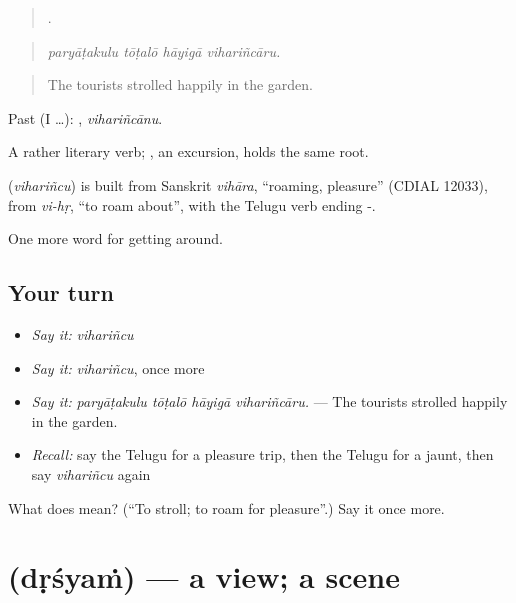 \begin{quote}
   .
\end{quote}

\begin{quote}
\emph{paryāṭakulu tōṭalō hāyigā vihariñcāru.}
\end{quote}

\begin{quote}
The tourists strolled happily in the garden.
\end{quote}

Past (I …): , \emph{vihariñcānu}.

A rather literary verb; , an excursion, holds the same root.

\begin{cousinweb}
\textbf{} (\emph{vihariñcu}) is built from Sanskrit \emph{vihāra}, \textquotedblleft{}roaming, pleasure\textquotedblright{} (CDIAL 12033), from \emph{vi-hṛ}, \textquotedblleft{}to roam about\textquotedblright{}, with the Telugu verb ending -.
\end{cousinweb}

\begin{grammarlens}[title={What you've built}]
One more word for getting around.
\end{grammarlens}

\subsection*{Your turn}
\begin{itemize}
\raggedright
  \item \emph{Say it:} \emph{vihariñcu}
  \item \emph{Say it:} \emph{vihariñcu}, once more
  \item \emph{Say it:} \emph{paryāṭakulu tōṭalō hāyigā vihariñcāru.} — The tourists strolled happily in the garden.
  \item \emph{Recall:} say the Telugu for a pleasure trip, then the Telugu for a jaunt, then say \emph{vihariñcu} again
\end{itemize}

\begin{tcolorbox}[breakable,colback=teal!4,colframe=teal!35!black,title={Before you move on}]
What does  mean? (\textquotedblleft{}To stroll; to roam for pleasure\textquotedblright{}.) Say it once more.
\end{tcolorbox}
\section[\texorpdfstring{\te{దృశ్యం} (dṛśyaṁ)}{దృశ్యం (dṛśyaṁ)}]{ (dṛśyaṁ) — a view; a scene}

